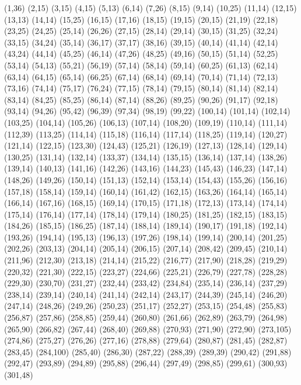 (1,36)
(2,15)
(3,15)
(4,15)
(5,13)
(6,14)
(7,26)
(8,15)
(9,14)
(10,25)
(11,14)
(12,15)
(13,13)
(14,14)
(15,25)
(16,15)
(17,16)
(18,15)
(19,15)
(20,15)
(21,19)
(22,18)
(23,25)
(24,25)
(25,14)
(26,26)
(27,15)
(28,14)
(29,14)
(30,15)
(31,25)
(32,24)
(33,15)
(34,24)
(35,14)
(36,17)
(37,17)
(38,16)
(39,15)
(40,14)
(41,14)
(42,14)
(43,24)
(44,14)
(45,25)
(46,14)
(47,26)
(48,25)
(49,16)
(50,15)
(51,14)
(52,25)
(53,14)
(54,13)
(55,21)
(56,19)
(57,14)
(58,14)
(59,14)
(60,25)
(61,13)
(62,14)
(63,14)
(64,15)
(65,14)
(66,25)
(67,14)
(68,14)
(69,14)
(70,14)
(71,14)
(72,13)
(73,16)
(74,14)
(75,17)
(76,24)
(77,15)
(78,14)
(79,15)
(80,14)
(81,14)
(82,14)
(83,14)
(84,25)
(85,25)
(86,14)
(87,14)
(88,26)
(89,25)
(90,26)
(91,17)
(92,18)
(93,14)
(94,26)
(95,42)
(96,39)
(97,34)
(98,19)
(99,22)
(100,14)
(101,14)
(102,14)
(103,25)
(104,14)
(105,26)
(106,13)
(107,14)
(108,20)
(109,19)
(110,14)
(111,14)
(112,39)
(113,25)
(114,14)
(115,18)
(116,14)
(117,14)
(118,25)
(119,14)
(120,27)
(121,14)
(122,15)
(123,30)
(124,43)
(125,21)
(126,19)
(127,13)
(128,14)
(129,14)
(130,25)
(131,14)
(132,14)
(133,37)
(134,14)
(135,15)
(136,14)
(137,14)
(138,26)
(139,14)
(140,13)
(141,16)
(142,26)
(143,16)
(144,23)
(145,43)
(146,23)
(147,14)
(148,26)
(149,26)
(150,14)
(151,13)
(152,14)
(153,14)
(154,43)
(155,26)
(156,16)
(157,18)
(158,14)
(159,14)
(160,14)
(161,42)
(162,15)
(163,26)
(164,14)
(165,14)
(166,14)
(167,16)
(168,15)
(169,14)
(170,15)
(171,18)
(172,13)
(173,14)
(174,14)
(175,14)
(176,14)
(177,14)
(178,14)
(179,14)
(180,25)
(181,25)
(182,15)
(183,15)
(184,26)
(185,15)
(186,25)
(187,14)
(188,14)
(189,14)
(190,17)
(191,18)
(192,14)
(193,26)
(194,14)
(195,13)
(196,13)
(197,26)
(198,14)
(199,14)
(200,14)
(201,25)
(202,26)
(203,13)
(204,14)
(205,14)
(206,15)
(207,14)
(208,42)
(209,45)
(210,14)
(211,96)
(212,30)
(213,18)
(214,14)
(215,22)
(216,77)
(217,90)
(218,28)
(219,29)
(220,32)
(221,30)
(222,15)
(223,27)
(224,66)
(225,21)
(226,79)
(227,78)
(228,28)
(229,30)
(230,70)
(231,27)
(232,44)
(233,42)
(234,84)
(235,14)
(236,14)
(237,29)
(238,14)
(239,14)
(240,14)
(241,14)
(242,14)
(243,17)
(244,39)
(245,14)
(246,20)
(247,14)
(248,26)
(249,26)
(250,23)
(251,17)
(252,27)
(253,15)
(254,48)
(255,83)
(256,87)
(257,86)
(258,85)
(259,44)
(260,80)
(261,66)
(262,89)
(263,79)
(264,98)
(265,90)
(266,82)
(267,44)
(268,40)
(269,88)
(270,93)
(271,90)
(272,90)
(273,105)
(274,86)
(275,27)
(276,26)
(277,16)
(278,88)
(279,64)
(280,87)
(281,45)
(282,87)
(283,45)
(284,100)
(285,40)
(286,30)
(287,22)
(288,39)
(289,39)
(290,42)
(291,88)
(292,47)
(293,89)
(294,89)
(295,88)
(296,44)
(297,49)
(298,85)
(299,61)
(300,93)
(301,48)
